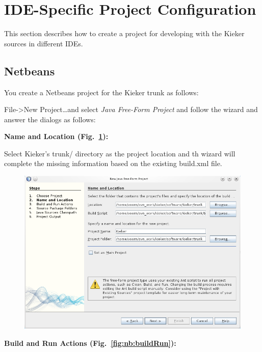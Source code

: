 \section{IDE-Specific Project Configuration}

This section describes how to create a project for developing with the 
Kieker sources in different IDEs.

\subsection{Netbeans}

You create a Netbeans project for the Kieker trunk as follows:

\begin{compactenum}
\item File->New Project\ldots and select \textit{Java Free-Form Project} and 
follow the wizard and answer the dialogs as follows:

\begin{compactenum}
\item \textbf{Name and Location (Fig.~\ref{fig:nb:location}):} %

Select Kieker's trunk/ directory as the project location and th wizard will %
complete the missing information based on the existing build.xml file.

\begin{figure}[H]\centering
\includegraphics[scale=0.5]{figures/netbeans-NameAndLocation}
\caption{}
\label{fig:nb:location}
\end{figure}

\item \textbf{Build and Run Actions (Fig.~\ref{fig:nb:buildRun}):} %


\end{compactenum}
\end{compactenum}
